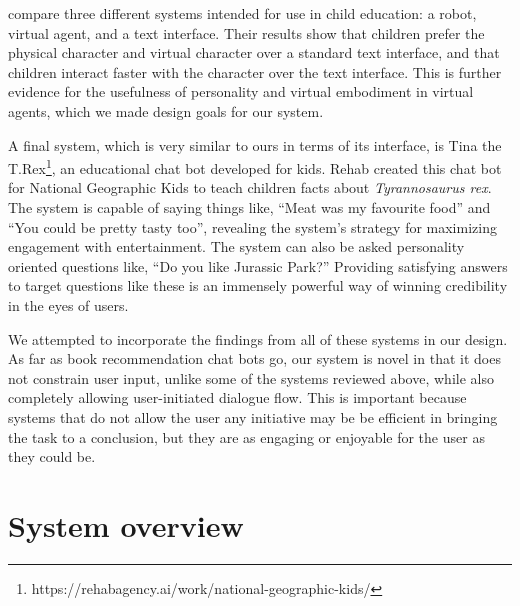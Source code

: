 \documentclass[11pt,a4paper]{article}
\begin{document}
\citeauthor{looije2008children}  compare three different systems intended for use in child education: a robot, virtual agent, and a text interface. Their results show that children prefer the physical character and virtual character over a standard text interface, and that children interact faster with the character over the text interface. This is further evidence for the usefulness of personality and virtual embodiment in virtual agents, which we made design goals for our system. 

A final system, which is very similar to ours in terms of its interface, is Tina the T.Rex\footnote{{https://rehabagency.ai/work/national-geographic-kids/}}, an educational chat bot developed for kids. Rehab created this chat bot for National Geographic Kids to teach children facts about \textit{Tyrannosaurus rex}. The system is capable of saying things like, ``Meat was my favourite food'' and ``You could be pretty tasty too'', revealing the system's strategy for maximizing engagement with entertainment. The system can also be asked personality oriented questions like, ``Do you like Jurassic Park?'' Providing satisfying answers to target questions like these is an immensely powerful way of winning credibility in the eyes of users.

We attempted to incorporate the findings from all of these systems in our design. As far as book recommendation chat bots go, our system is novel in that it does not constrain user input, unlike some of the systems reviewed above, while also completely allowing user-initiated dialogue flow. This is important because systems that do not allow the user any initiative may be be efficient in bringing the task to a conclusion, but they are as engaging or enjoyable for the user as they could be.




\section{System overview}
\end{document}
